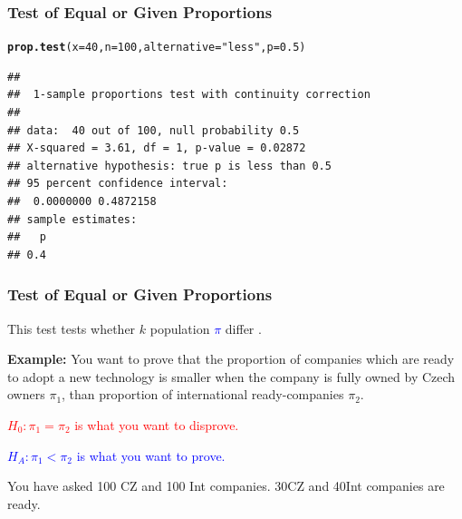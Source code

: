 \documentclass[12pt]{beamer}\usepackage[]{graphicx}\usepackage[]{color}
\makeatletter
\newcommand{\hlnum}[1]{\textcolor[rgb]{0.686,0.059,0.569}{#1}}%
\newcommand{\hlstr}[1]{\textcolor[rgb]{0.192,0.494,0.8}{#1}}%
\newcommand{\hlstd}[1]{\textcolor[rgb]{0.345,0.345,0.345}{#1}}%
\newcommand{\hlkwc}[1]{\textcolor[rgb]{0.333,0.667,0.333}{#1}}%
\newcommand{\hlkwd}[1]{\textcolor[rgb]{0.737,0.353,0.396}{\textbf{#1}}}%
\newenvironment{kframe}{%
 \def\at@end@of@kframe{}%
 \ifinner\ifhmode%
  \def\at@end@of@kframe{\end{minipage}}%
  \begin{minipage}{\columnwidth}%
 \fi\fi%
 \def\FrameCommand##1{\hskip\@totalleftmargin \hskip-\fboxsep
 \colorbox{shadecolor}{##1}\hskip-\fboxsep
     \hskip-\linewidth \hskip-\@totalleftmargin \hskip\columnwidth}%
 \MakeFramed {\advance\hsize-\width
   \@totalleftmargin\z@ \linewidth\hsize
   \@setminipage}}%
 {\par\unskip\endMakeFramed%
 \at@end@of@kframe}
\newenvironment{knitrout}{}{} %
\makeatother
\begin{document}

\begin{frame}[fragile]
\frametitle{Test of Equal or Given Proportions}

\begin{knitrout}\small
{}\color{fgcolor}\begin{kframe}
\begin{alltt}
\hlkwd{prop.test}\hlstd{(}\hlkwc{x}\hlstd{=}\hlnum{40}\hlstd{,} \hlkwc{n}\hlstd{=}\hlnum{100}\hlstd{,} \hlkwc{alternative}\hlstd{=}\hlstr{"less"}\hlstd{,} \hlkwc{p}\hlstd{=}\hlnum{0.5}\hlstd{)}
\end{alltt}
\begin{verbatim}
## 
## 	1-sample proportions test with continuity correction
## 
## data:  40 out of 100, null probability 0.5
## X-squared = 3.61, df = 1, p-value = 0.02872
## alternative hypothesis: true p is less than 0.5
## 95 percent confidence interval:
##  0.0000000 0.4872158
## sample estimates:
##   p 
## 0.4
\end{verbatim}
\end{kframe}
\end{knitrout}

\end{frame}


\begin{frame}\large
\frametitle{Test of Equal or Given Proportions}

This test tests whether $k$ population \textcolor{blue}{$\pi$} differ .\bigskip

\textbf{Example:} You want to prove that the proportion of companies which are ready to adopt a new technology is smaller when the company is fully owned by Czech owners $\pi_1$, than proportion of international ready-companies $\pi_2$. \smallskip{}


\textcolor{red}{$H_0: \pi_1=\pi_2$ is what you want to disprove.} \smallskip

\textcolor{blue}{$H_A: \pi_1< \pi_2$ is what you want to prove.}\bigskip{}

You have asked 100 CZ and 100 Int companies. 30CZ and 40Int companies are ready.

\end{frame}

\end{document}

